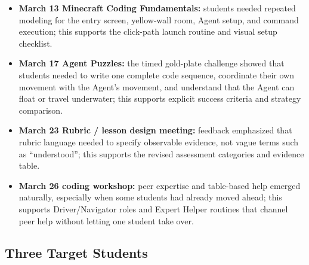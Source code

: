 \documentclass[12pt]{article}
\begin{document}
\begin{designbox}
\begin{itemize}
\item \textbf{March 13 Minecraft Coding Fundamentals:} students needed repeated modeling for the entry screen, yellow-wall room, Agent setup, and command execution; this supports the click-path launch routine and visual setup checklist.
\item \textbf{March 17 Agent Puzzles:} the timed gold-plate challenge showed that students needed to write one complete code sequence, coordinate their own movement with the Agent's movement, and understand that the Agent can float or travel underwater; this supports explicit success criteria and strategy comparison.
\item \textbf{March 23 Rubric / lesson design meeting:} feedback emphasized that rubric language needed to specify observable evidence, not vague terms such as ``understood''; this supports the revised assessment categories and evidence table.
\item \textbf{March 26 coding workshop:} peer expertise and table-based help emerged naturally, especially when some students had already moved ahead; this supports Driver/Navigator roles and Expert Helper routines that channel peer help without letting one student take over.
\end{itemize}
\end{designbox}

\subsection{Three Target Students}
\end{document}
